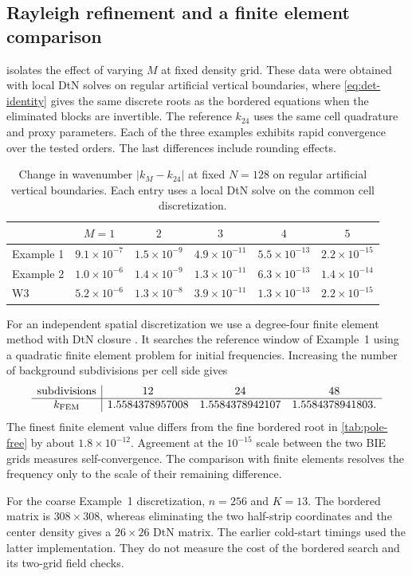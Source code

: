 \subsection{Rayleigh refinement and a finite element comparison}\label{sec:exp-order}
 isolates the effect of varying $M$ at fixed density grid.
These data were obtained with local DtN solves on regular artificial
vertical boundaries, where \eqref{eq:det-identity} gives the same discrete
roots as the bordered equations when the eliminated blocks are invertible.
The reference $k_{24}$ uses the same cell quadrature and proxy parameters.
Each of the three examples exhibits rapid convergence over the tested orders.
The last differences include rounding effects.
\begin{table}[htbp]
\centering
\caption{Change in wavenumber $|k_M-k_{24}|$ at fixed $N=128$ on
regular artificial vertical boundaries. Each entry uses a local DtN solve
on the common cell discretization.}
\label{tab:order}
\begin{tabular}{lccccc}
\toprule
 & $M=1$ & $2$ & $3$ & $4$ & $5$\\
\midrule
Example 1 & $9.1\times10^{-7}$ & $1.5\times10^{-9}$ & $4.9\times10^{-11}$ & $5.5\times10^{-13}$ & $2.2\times10^{-15}$\\
Example 2 & $1.0\times10^{-6}$ & $1.4\times10^{-9}$ & $1.3\times10^{-11}$ & $6.3\times10^{-13}$ & $1.4\times10^{-14}$\\
W3 & $5.2\times10^{-6}$ & $1.3\times10^{-8}$ & $3.9\times10^{-11}$ & $1.3\times10^{-13}$ & $2.2\times10^{-15}$\\
\bottomrule
\end{tabular}
\end{table}


For an independent spatial discretization we use a degree-four finite
element method with DtN closure \cite{Fliss2013,KlindworthSchmidtFliss2014}.
It searches the reference window of Example~1 using a quadratic
finite element problem for initial frequencies. Increasing the number
of background subdivisions per cell side gives
\[
\begin{array}{c|ccc}
 \text{subdivisions} & 12 & 24 & 48\\ \hline
 k_{\rm FEM} & 1.5584378957008 & 1.5584378942107 & 1.5584378941803 .
\end{array}
\]
The finest finite element value differs from the fine bordered root in
\cref{tab:pole-free} by about $1.8\times10^{-12}$. Agreement at the
$10^{-15}$ scale between the two BIE grids measures self-convergence.
The comparison with finite elements resolves the frequency only to the
scale of their remaining difference.

For the coarse Example~1 discretization, $n=256$ and $K=13$. The bordered
matrix is $308\times308$, whereas eliminating the two half-strip coordinates
and the center density gives a $26\times26$ DtN matrix. The earlier cold-start
timings used the latter implementation. They do not measure the cost
of the bordered search and its two-grid field checks.
